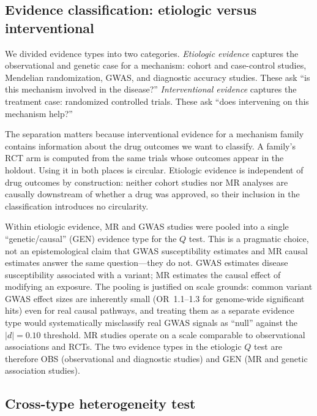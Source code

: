 \documentclass[11pt]{article}
\begin{document}
\subsection{Evidence classification: etiologic versus interventional}

We divided evidence types into two categories. \emph{Etiologic evidence} captures the observational and genetic case for a mechanism: cohort and case-control studies, Mendelian randomization, GWAS, and diagnostic accuracy studies. These ask ``is this mechanism involved in the disease?'' \emph{Interventional evidence} captures the treatment case: randomized controlled trials. These ask ``does intervening on this mechanism help?''

The separation matters because interventional evidence for a mechanism family contains information about the drug outcomes we want to classify. A family's RCT arm is computed from the same trials whose outcomes appear in the holdout. Using it in both places is circular. Etiologic evidence is independent of drug outcomes by construction: neither cohort studies nor MR analyses are causally downstream of whether a drug was approved, so their inclusion in the classification introduces no circularity.

Within etiologic evidence, MR and GWAS studies were pooled into a single ``genetic/causal'' (GEN) evidence type for the $Q$ test. This is a pragmatic choice, not an epistemological claim that GWAS susceptibility estimates and MR causal estimates answer the same question---they do not. GWAS estimates disease susceptibility associated with a variant; MR estimates the causal effect of modifying an exposure. The pooling is justified on scale grounds: common variant GWAS effect sizes are inherently small (OR~1.1--1.3 for genome-wide significant hits) even for real causal pathways, and treating them as a separate evidence type would systematically misclassify real GWAS signals as ``null'' against the $|d| = 0.10$ threshold. MR studies operate on a scale comparable to observational associations and RCTs. The two evidence types in the etiologic $Q$ test are therefore OBS (observational and diagnostic studies) and GEN (MR and genetic association studies).

\subsection{Cross-type heterogeneity test}
\end{document}
